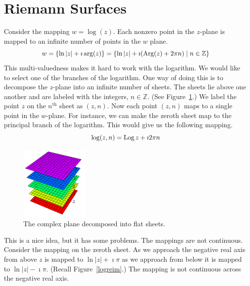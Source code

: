 










\section{Riemann Surfaces}

Consider the mapping $w = \log(z)$.  Each nonzero point in the 
$z$-plane is mapped to an infinite number of points in the $w$ plane.
\[
w = \{ \ln |z| + \imath \arg(z) \} 
= \{ \ln |z| + \imath (\mathop{\mathrm{Arg}}\nolimits(z) + 2 \pi n) \mid n \in \mathbb{Z} \} 
\]
This multi-valuedness makes it hard to work with the logarithm.  We would
like to select one of the branches of the logarithm.  One way of doing 
this is to decompose the $z$-plane into an infinite number of sheets.
The sheets lie above one another and are labeled with the integers, 
$n \in \mathbb{Z}$.  (See Figure~\ref{figure flat-sheets}.)
We label the point $z$ on the $n^{\mathrm{th}}$ sheet as $(z,n)$.  Now each
point $(z,n)$ maps to a single point in the $w$-plane.  For instance,
we can make the zeroth sheet map to the principal branch of the logarithm.
This would give us the following mapping.
\[
\log (z,n) = \mathop{\mathrm{Log}}\nolimits z + \imath 2 \pi n
\]

\begin{figure}[htbp!]
  \begin{center}
    \includegraphics[width=0.3\textwidth]{fcv/function/flat-sheets}
  \end{center}
  \caption{The complex plane decomposed into flat sheets.}
  \label{figure flat-sheets}
\end{figure}



This is a nice idea, but it has some problems.  The mappings are not 
continuous.  Consider the mapping on the zeroth sheet.  As we approach
the negative real axis from above $z$ is mapped to $\ln |z| + \imath \pi$
as we approach from below it is mapped to $\ln |z| - \imath \pi$.
(Recall Figure~\ref{logreim}.)  The mapping is not continuous across the 
negative real axis.

